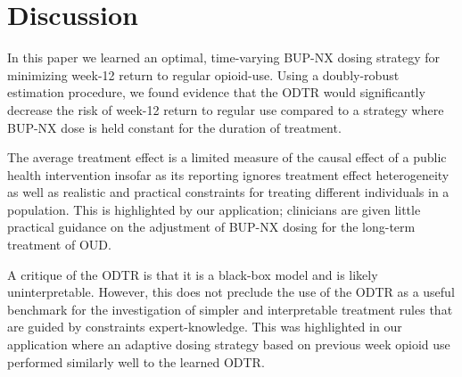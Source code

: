 \documentclass[11pt]{article}
\begin{document}
\section{Discussion}

In this paper we learned an optimal, time-varying BUP-NX dosing strategy for minimizing week-12 return to regular opioid-use. Using a doubly-robust estimation procedure, we found evidence that the ODTR would significantly decrease the risk of week-12 return to regular use compared to a strategy where BUP-NX dose is held constant for the duration of treatment. 

The average treatment effect is a limited measure of the causal effect of a public health intervention insofar as its reporting ignores treatment effect heterogeneity as well as realistic and practical constraints for treating different individuals in a population. This is highlighted by our application; clinicians are given little practical guidance on the adjustment of BUP-NX dosing for the long-term treatment of OUD. 

A critique of the ODTR is that it is a black-box model and is likely uninterpretable. However, this does not preclude the use of the ODTR as a useful benchmark for the investigation of simpler and interpretable treatment rules that are guided by constraints expert-knowledge. This was highlighted in our application where an adaptive dosing strategy based on previous week opioid use performed similarly well to the learned ODTR. 

\newpage
\renewcommand{\refname}{References}



\end{document}
